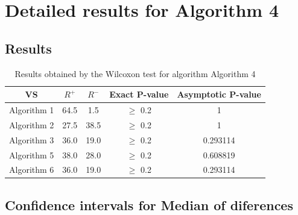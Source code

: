 \documentclass[a4paper,10pt]{article}
\begin{document}
 \clearpage 


\section{Detailed results for Algorithm 4}


\subsection{Results}

\begin{table}[!htp]
\centering\small
\begin{tabular}{
|c|c|c|c|c|}
\hline
 VS & $R^{+}$ & $R^{-}$ & Exact P-value & Asymptotic P-value \\ \hline 
Algorithm 1 & 64.5 & 1.5 & $\geq$ 0.2 & 1\\ \hline 
Algorithm 2 & 27.5 & 38.5 & $\geq$ 0.2 & 1\\ \hline 
Algorithm 3 & 36.0 & 19.0 & $\geq$ 0.2 & 0.293114\\ \hline 
Algorithm 5 & 38.0 & 28.0 & $\geq$ 0.2 & 0.608819\\ \hline 
Algorithm 6 & 36.0 & 19.0 & $\geq$ 0.2 & 0.293114\\ \hline 

\end{tabular}
\caption{Results obtained by the Wilcoxon test for algorithm Algorithm 4}
\end{table}

\subsection{Confidence intervals for Median of diferences}
\end{document}
